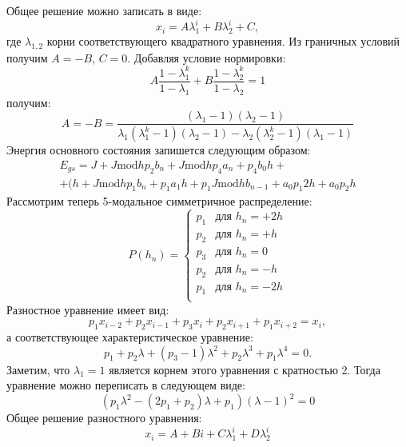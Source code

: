 Общее решение можно записать в виде:
\begin{equation}
x_i = A \lambda_1^i + B \lambda_2^i + C,
\end{equation}
где $\lambda_{1,2}$ корни соответствующего квадратного уравнения.
Из граничных условий получим $A=-B$, $C=0$. Добавляя условие нормировки:
\begin{equation}
A \frac{1-\lambda_1^k}{1-\lambda_1} + B \frac{1-\lambda_2^k}{1-\lambda_2} =1
\end{equation}
получим:
\begin{equation}
A=-B = \frac{(\lambda_1-1)(\lambda_2-1)}{\lambda_1(\lambda_1^k-1)(\lambda_2-1) - \lambda_2(\lambda_2^k-1)(\lambda_1-1)}
\end{equation}
Энергия основного состояния запишется следующим образом:
\begin{multline}
E_{gs} = J + J \text{mod} h p_2 b_n + J \text{mod} h p_4 a_n + p_4 b_0 h+\\
+ (h + J \text{mod} h p_1 b_n + p_1 a_1 h +p_1J \text{mod} h b_{n-1} + a_0 p_1 2 h + a_0 p_2 h 
\end{multline}
Рассмотрим теперь 5-модальное симметричное распределение:
\begin{equation}
P(h_n) =
\begin{cases}
	p_1 &\mbox{для } h_n= +2h \\
	p_2 &\mbox{для } h_n= +h \\
	p_3 &\mbox{для } h_n= 0\\
	p_2 &\mbox{для } h_n = -h\\
	p_1&\mbox{для } h_n = -2h\\
\end{cases}
\end{equation}
Разностное уравнение имеет вид:
\begin{equation}
p_1 x_{i-2} + p_2 x_{i-1} + p_3 x_i + p_2 x_{i+1} + p_1 x_{i+2} = x_i,
\end{equation}
а соответствующее характеристическое уравнение:
\begin{equation}
p_1 + p_2 \lambda + (p_3-1) \lambda^2 + p_2 \lambda^3 + p_1 \lambda^4 = 0.
\end{equation}
Заметим, что $\lambda_1=1$ является корнем этого уравнения с кратностью 2. Тогда уравнение можно переписать в следующем виде:
\begin{equation}
(p_1\lambda^2 - (2p_1+p_2) \lambda + p_1) (\lambda - 1)^2 =0
\end{equation}
Общее решение разностного уравнения:
\begin{equation}
x_i = A + B i + C \lambda_1^i + D \lambda_2^i
\end{equation}
